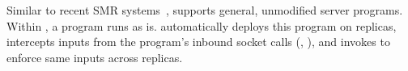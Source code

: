 Similar to recent SMR systems~\cite{rex:eurosys14,crane:sosp15}, \xxx 
supports general, unmodified server programs. Within \xxx, a program runs as is. 
\xxx automatically deploys this program on replicas, intercepts inputs from the 
program's inbound socket calls (\eg, \recv), and invokes \paxos to 
enforce same inputs across replicas.






%





